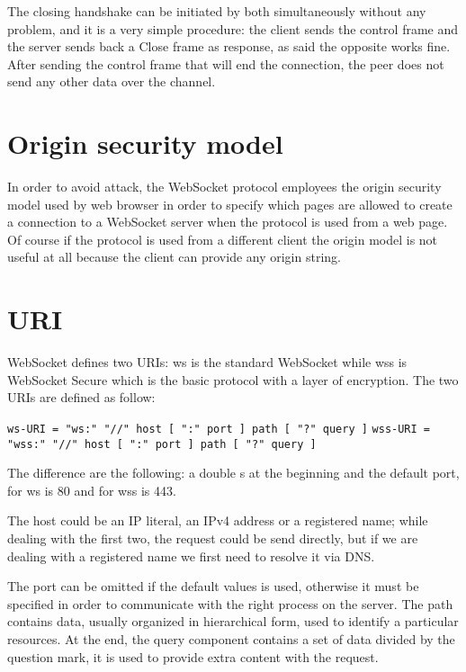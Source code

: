 The closing handshake can be initiated by both simultaneously without any problem, and it is a very simple procedure:
the client sends the control frame and the server sends back a Close frame as response, as said the opposite works fine.\newline
After sending the control frame that will end the connection, the peer does not send any other data over the channel.

\section{Origin security model}
In order to avoid attack, the WebSocket protocol employees the origin security model used by web browser in order
to specify which pages are allowed to create a connection to a WebSocket server when the protocol is used from a web page.\newline
Of course if the protocol is used from a different client the origin model is not useful at all because the client can provide any origin string.

\section{URI}
WebSocket defines two URIs: ws is the standard WebSocket while wss is WebSocket Secure which is the basic protocol with a layer of encryption.\newline
The two URIs are defined as follow:\newline

\texttt{ws-URI = "ws:" "//" host [ ":" port ] path [ "?" query ]}\newline
\texttt{wss-URI = "wss:" "//" host [ ":" port ] path [ "?" query ]}\newline

The difference are the following: a double s at the beginning and the default port, for ws is 80 and for wss is 443.\newline

The host could be an IP literal, an IPv4 address or a registered name; while dealing with the first two, the request could be send directly, but if we are dealing with a registered name we first need to resolve it via DNS.\newline

The port can be omitted if the default values is used, otherwise it must be specified in order to communicate with the right process on the server.\newline
The path contains data, usually organized in hierarchical form, used to identify a particular resources.\newline
At the end, the query component contains a set of data divided by the question mark, it is used to provide extra content with the request.\newline


